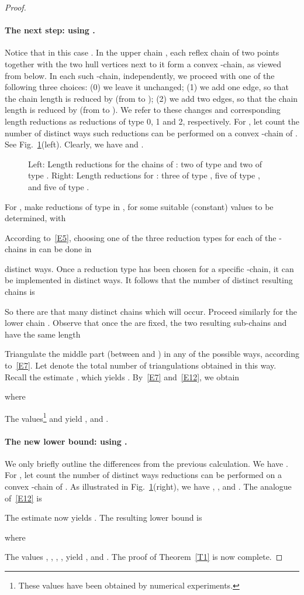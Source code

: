 \documentclass[11pt]{article}
\begin{document}
\begin{proof}
\paragraph{The next step: using .}
Notice that in this case .
In the upper chain , each reflex chain of two points together with the two
hull vertices next to it form a convex -chain, as viewed from below.
In each such -chain, independently, we proceed with one of the
following three choices: (0) we leave it unchanged; (1) we add
one edge, so that the chain length is reduced by  (from  to
); (2) we add two edges, so that the chain length is reduced by 
(from  to ). We refer to these changes and corresponding length
reductions as reductions of type 0, 1 and 2, respectively.
For , let  count the number of distinct ways such
reductions can be performed on a convex -chain of .
See Fig.~\ref{f7}(left). Clearly, we have  and .
\begin{figure}[h]
\centerline{\epsfysize=1.22in }
\caption{Left: Length reductions for the chains of
: two of type  and two of type .
Right: Length reductions for : three of type
, five of type , and five of type .}
\label{f7}
\end{figure}

For , make  reductions of type  in ,
for some suitable (constant) values  to be determined, with


According to~\eqref{E5}, choosing one of the three reduction types for
each of the -chains in  can be done in

distinct ways. Once a reduction type  has been chosen for a
specific -chain, it can be implemented in  distinct ways.
It follows that the number of distinct resulting chains  is


So there are that many distinct chains  which will occur.
Proceed similarly for the lower chain . Observe that once the 
are fixed, the two resulting sub-chains  and 
have the same length

Triangulate the middle part (between  and ) in any of the
possible ways, according to~\eqref{E7}. Let  denote the total
number of triangulations obtained in this way.
Recall the estimate , which yields
.
By~\eqref{E7} and~\eqref{E12}, we obtain

where

The values\footnote{These values have been obtained by numerical
experiments.}  and  yield
, and .


\paragraph{The new  lower bound: using .}
We only briefly outline the differences from the previous calculation.
We have .
For , let  count the number of distinct ways
reductions can be performed on a convex -chain of .
As illustrated in Fig.~\ref{f7}(right), we have , ,
and . The analogue of~\eqref{E12} is

The estimate 
now yields .
The resulting lower bound is

where

The values , , , ,
yield , and .
The proof of Theorem~\ref{T1} is now complete.
\end{proof}
\end{document}
